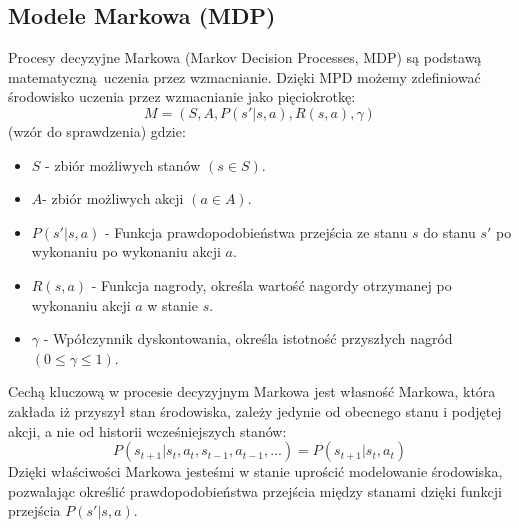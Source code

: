 \documentclass[a4paper, 12pt]{article}
\begin{document}
    \subsection{Modele Markowa (MDP)}
    Procesy decyzyjne Markowa (Markov Decision Processes, MDP) są podstawą matematyczną uczenia przez wzmacnianie. Dzięki MPD możemy zdefiniować
    środowisko uczenia przez wzmacnianie jako pięciokrotkę:
    \[ M = (S,A, P(s'|s,a), R(s,a), \gamma) \] (wzór do sprawdzenia)
    gdzie:
    \begin{itemize}
        \item \( S \)  - zbiór możliwych stanów \( (s \in S ) \).
        \item \( A \)- zbiór możliwych akcji \( (a \in A ) \).
        \item \( P(s'|s,a) \) - Funkcja prawdopodobieństwa przejścia ze stanu \( s \) do stanu \( s' \) po wykonaniu po wykonaniu akcji \( a \).
        \item \( R(s,a) \) - Funkcja nagrody, określa wartość nagordy otrzymanej po wykonaniu akcji \( a \) w stanie \( s \).
        \item \( \gamma \) - Wpółczynnik dyskontowania, określa istotność przyszłych nagród \( (0 \leq \gamma \leq 1) \).
    \end{itemize}
    Cechą kluczową w procesie decyzyjnym Markowa jest własność Markowa, która zakłada iż przyszył stan środowiska, zależy jedynie od obecnego
    stanu i podjętej akcji, a nie od historii wcześniejszych stanów:
    \[ P(s_{t+1}|s_t,a_t,s_{t-1},a_{t-1},...) = P(s_{t+1}|s_t, a_t) \]
    Dzięki właściwości Markowa jesteśmi w stanie uprościć modelowanie środowiska, pozwalając określić prawdopodobieństwa przejścia między stanami dzięki funkcji przejścia
    \( P(s'|s,a) \).
\end{document}
